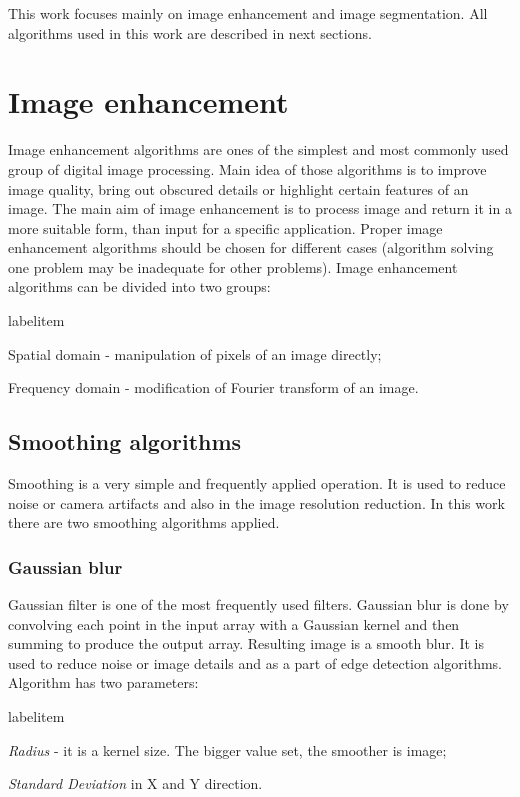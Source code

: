 \documentclass[a4paper,onecolumn,oneside,12pt]{memoir}
\makeatletter
\renewenvironment{itemize}{
  \begin{list}{  
  \csname labelitem\romannumeral\the\@listdepth\endcsname}{
  \setlength{\leftmargin}{1em}
	\setlength{\topsep}{6pt}%
	\setlength{\partopsep}{0pt}%
	\setlength{\parskip}{0pt}%
	\setlength{\parsep}{0pt}%
	\setlength{\itemsep}{0pt}}
}{
  \end{list}
}
\makeatother
\begin{document}
This work focuses mainly on image enhancement and image segmentation. All algorithms used in this 
work are described in next sections.

\section{Image enhancement}

Image enhancement algorithms are ones of the simplest and most commonly used group of digital image
processing. Main idea of those algorithms is to improve image quality, bring out obscured details 
or highlight certain features of an image. The main aim of image enhancement is to process image 
and return it in a more suitable form, than input for a specific application. Proper image enhancement
algorithms should be chosen for different cases (algorithm solving one problem may be inadequate for
other problems). Image enhancement algorithms can be divided into two groups:

\begin{itemize}
  \item Spatial domain - manipulation of pixels of an image directly;
  \item Frequency domain - modification of Fourier transform of an image.
\end{itemize}

\subsection{Smoothing algorithms}

Smoothing \cite{learningOpenCv} is a very simple and frequently applied operation. It is used to
reduce noise or camera artifacts and also in the image resolution reduction. In this work there are
two smoothing algorithms applied.

\subsubsection{Gaussian blur}

Gaussian filter is one of the most frequently used filters. Gaussian blur \cite{learningOpenCv} is
done by convolving each point in the input array with a Gaussian kernel and then
summing to produce the output array. Resulting image is a smooth blur. It is used to reduce noise
or image details and as a part of edge detection algorithms. Algorithm has two parameters:

\begin{itemize}
  \item \textit{Radius} - it is a kernel size. The bigger value set, the smoother is image;
  \item \textit{Standard Deviation} in X and Y direction.
\end{itemize}
\end{document}

